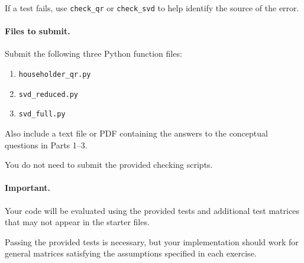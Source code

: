 \documentclass{ximera}
\begin{document}
If a test fails, use \texttt{check\_qr} or \texttt{check\_svd} to help
identify the source of the error.

\paragraph{Files to submit.}

Submit the following three Python function files:

\begin{enumerate}
    \item \texttt{householder\_qr.py}
    \item \texttt{svd\_reduced.py}
    \item \texttt{svd\_full.py}
\end{enumerate}

Also include a text file or PDF containing the answers to the
conceptual questions in Parts 1--3.

You do not need to submit the provided checking scripts.

\paragraph{Important.}

Your code will be evaluated using the provided tests and
additional test matrices that may not appear in the starter
files.

Passing the provided tests is necessary, but your implementation
should work for general matrices satisfying the assumptions
specified in each exercise.
\end{document}
